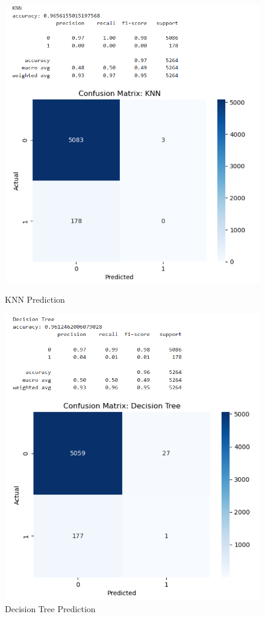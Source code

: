 \documentclass{article}
\begin{document}
\newpage
\begin{figure}[h!]
	\begin{minipage}{0.48\textwidth}
		\centering
		\includegraphics[width=0.7\linewidth]{../Image/P26.jpg}
		\caption{KNN Prediction}
		\label{fig:P26}
	\end{minipage}\hfill
	\begin{minipage}{0.48\textwidth}
		\centering
		\includegraphics[width=0.7\linewidth]{../Image/P28.jpg}
		\caption{Decision Tree Prediction}
		\label{fig:P28}
	\end{minipage}
	
	\vspace{0.5cm} %
	

\end{figure}
\end{document}
